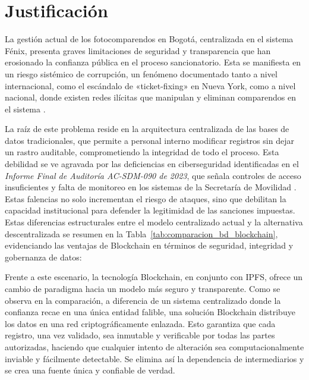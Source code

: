 \section{\large Justificación}
La gestión actual de los fotocomparendos en Bogotá, centralizada en el sistema Fénix, presenta graves limitaciones de seguridad y transparencia que han erosionado la confianza pública en el proceso sancionatorio. Esta se manifiesta en un riesgo sistémico de corrupción, un fenómeno documentado tanto a nivel internacional, como el escándalo de «ticket-fixing» en Nueva York, como a nivel nacional, donde existen redes ilícitas que manipulan y eliminan comparendos en el sistema \parencite{barbaro2011ticketfixing, blogAletta, procuraduriaBucaramanga}.

La raíz de este problema reside en la arquitectura centralizada de las bases de datos tradicionales, que permite a personal interno modificar registros sin dejar un rastro auditable, comprometiendo la integridad de todo el proceso. Esta debilidad se ve agravada por las deficiencias en ciberseguridad identificadas en el \textit{Informe Final de Auditoría AC-SDM-090 de 2023}, que señala controles de acceso insuficientes y falta de monitoreo en los sistemas de la Secretaría de Movilidad \parencite{auditoriaSDM}. Estas falencias no solo incrementan el riesgo de ataques, sino que debilitan la capacidad institucional para defender la legitimidad de las sanciones impuestas.
Estas diferencias estructurales entre el modelo centralizado actual y la alternativa descentralizada se resumen en la Tabla~\ref{tab:comparacion_bd_blockchain}, evidenciando las ventajas de Blockchain en términos de seguridad, integridad y gobernanza de datos:



Frente a este escenario, la tecnología Blockchain, en conjunto con IPFS, ofrece un cambio de paradigma hacia un modelo más seguro y transparente. Como se observa en la comparación, a diferencia de un sistema centralizado donde la confianza recae en una única entidad falible, una solución Blockchain distribuye los datos en una red criptográficamente enlazada. Esto garantiza que cada registro, una vez validado, sea inmutable y verificable por todas las partes autorizadas, haciendo que cualquier intento de alteración sea computacionalmente inviable y fácilmente detectable. Se elimina así la dependencia de intermediarios y se crea una fuente única y confiable de verdad.

